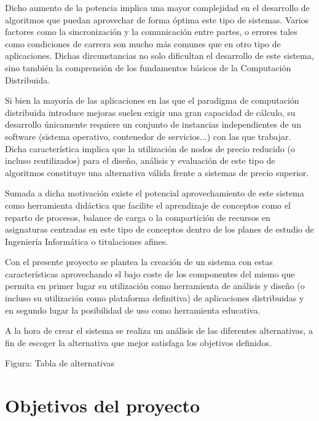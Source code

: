 Dicho aumento de la potencia implica una mayor complejidad en el desarrollo de algoritmos que puedan aprovechar de forma óptima este tipo de sistemas. Varios factores como la sincronización y la comunicación entre partes, o errores tales como condiciones de carrera son mucho más comunes que en otro tipo de aplicaciones. Dichas dircunstancias no solo dificultan el desarrollo de este sistema, sino también la comprensión de los fundamentos básicos de la Computación Distribuida. %

Si bien la mayoría de las aplicaciones en las que el paradigma de computación distribuida introduce mejoras suelen exigir una gran capacidad de cálculo, su desarrollo únicamente requiere un conjunto de instancias independientes de un software (sistema operativo, contenedor de servicios...) con las que trabajar. Dicha característica implica que la utilización de nodos de precio reducido (o incluso reutilizados) para el diseño, análisis y evaluación de este tipo de algoritmos constituye una alternativa válida frente a sistemas de precio superior.

Sumada a dicha motivación existe el potencial aprovechamiento de este sistema como herramienta didáctica que facilite el aprendizaje de conceptos como el reparto de procesos, balance de carga o la compartición de recursos en asignaturas centradas en este tipo de conceptos dentro de los planes de estudio de Ingeniería Informática o titulaciones afines.

Con el presente proyecto se plantea la creación de un sistema con estas características aprovechando el bajo coste de los componentes del mismo que permita en primer lugar su utilización como herramienta de análisis y diseño (o incluso su utilización como plataforma definitiva) de aplicaciones distribuidas y en segundo lugar la posibilidad de uso como herramienta educativa.

A la hora de crear el sistema se realiza un análisis de las diferentes alternativas, a fin de escoger la alternativa que mejor satisfaga los objetivos definidos.

Figura: Tabla de alternativas

\section{Objetivos del proyecto}

